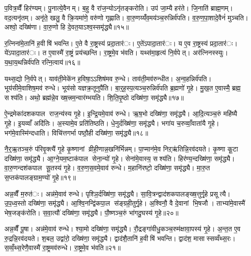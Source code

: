 प॒वित्र॒व्वैँ हिर॑ण्यम्। पु॒नात्ये॒वैनम्। ब॒हु वै रा॑ज॒न्योऽनृ॑तङ्करोति। उप॑ जा॒म्यै हर॑ते। जि॒नाति॑ ब्राह्म॒णम्। वद॒त्यनृ॑तम्। अनृ॑ते॒ खलु॒ वै क्रि॒यमा॑णे॒ वरु॑णो गृह्णाति। वा॒रु॒णय्यँ॑व॒मय॑ञ्च॒रुन्निर्व॑पति। व॒रु॒ण॒पा॒शादे॒वैनं॑ मुञ्चति। अश्वो॒ दख्षि॑णा। वा॒रु॒णो हि दे॒वत॒याऽश्व॒स्समृ॑द्ध्यै॥१५॥


र॒त्निना॑मे॒तानि॑ ह॒वीषि॑ भवन्ति। ए॒ते वै रा॒ष्ट्रस्य॑ प्रदा॒तार॑ः। ए॒ते॑ऽपादा॒तार॑ः। य ए॒व रा॒ष्ट्रस्य॑ प्रदा॒तार॑ः। ये॑ऽपादा॒तार॑ः। त ए॒वास्मै॑ रा॒ष्ट्रं प्रय॑च्छन्ति। रा॒ष्ट्रमे॒व भ॑वति। यथ्स॑मा॒हृत्य॑ नि॒र्वपेत्। अर॑त्निनस्स्युः। य॒था॒य॒थन्निर्व॑पति रत्नि॒त्वाय॑॥१६॥

यथ्स॒द्यो नि॒र्वपेत्। याव॑ती॒मेके॑न ह॒विषा॒ऽऽशिष॑मव रु॒न्धे। ताव॑ती॒मव॑रुन्धीत। अ॒न्व॒हन्निर्व॑पति। भूय॑सीमे॒वाशिष॒मव॑ रुन्धे। भूय॑सो यज्ञक्र॒तूनुपै॑ति। बा॒र्॒ह॒स्प॒त्यञ्च॒रुन्निर्व॑पति ब्र॒ह्मणो॑ गृ॒हे। मु॒ख॒त ए॒वास्मै॒ ब्रह्म॒ सश्य॑ति। अथो॒ ब्रह्म॑न्ने॒व ख्ष॒त्त्रम॒न्वार॑म्भयति। शि॒ति॒पृ॒ष्ठो दख्षि॑णा॒ समृ॑द्ध्यै॥१७॥

ऐ॒न्द्रमेका॑दशकपाल राज॒न्य॑स्य गृ॒हे। इ॒न्द्रि॒यमे॒वाव॑ रुन्धे। ऋ॒ष॒भो दख्षि॑णा॒ समृ॑द्ध्यै। आ॒दि॒त्यञ्च॒रुं महि॑ष्यै गृ॒हे। इ॒यव्वाँ अदि॑तिः। अ॒स्यामे॒व प्रति॑तिष्ठति। धे॒नुर्दख्षि॑णा॒ समृ॑द्ध्यै। भगा॑य च॒रुव्वाँ॒वाता॑यै गृ॒हे। भग॑मे॒वास्मि॑न्दधाति। विचि॑त्तगर्भा पष्ठौ॒ही दख्षि॑णा॒ समृ॑द्ध्यै॥१८॥

नै॒र्॒ऋ॒तञ्च॒रुं प॑रिवृ॒क्त्यै॑ गृ॒हे कृ॒ष्णानां व्रीही॒णान्न॒खनि॑र्भिन्नम्। पा॒प्मान॑मे॒व निऱ्ऋ॑तिन्नि॒रव॑दयते। कृ॒ष्णा कू॒टा दख्षि॑णा॒ समृ॑द्ध्यै। आ॒ग्ने॒यम॒ष्टाक॑पाल सेना॒न्यो॑ गृ॒हे। सेना॑मे॒वास्य॒ सश्य॑ति। हिर॑ण्य॒न्दख्षि॑णा॒ समृ॑द्ध्यै। वा॒रु॒णन्दश॑कपाल सू॒तस्य॑ गृ॒हे। व॒रु॒ण॒स॒वमे॒वाव॑ रुन्धे। म॒हानि॑रष्टो॒ दख्षि॑णा॒ समृ॑द्ध्यै। मा॒रु॒त स॒प्तक॑पालङ्ग्राम॒ण्यो॑ गृ॒हे॥१९॥

अन्न॒व्वैँ म॒रुत॑ः। अन्न॑मे॒वाव॑ रुन्धे। पृश्ञि॒र्दख्षि॑णा॒ समृ॑द्ध्यै। सा॒वि॒त्रन्द्वाद॑शकपालङ्ख्ष॒त्तुर्गृ॒हे प्रसूत्यै। उ॒प॒ध्व॒स्तो दख्षि॑णा॒ समृ॑द्ध्यै। आ॒श्वि॒नन्द्वि॑कपा॒ल स॑ङ्ग्रही॒तुर्गृ॒हे। अ॒श्विनौ॒ वै दे॒वानां भि॒षजौ। ताभ्या॑मे॒वास्मै॑ भेष॒जङ्क॑रोति। स॒वा॒त्यौ॑ दख्षि॑णा॒ समृ॑द्ध्यै। पौ॒ष्णञ्च॒रुं भा॑गदु॒घस्य॑ गृ॒हे॥२०॥

अन्न॒व्वैँ पू॒षा। अन्न॑मे॒वाव॑ रुन्धे। श्या॒मो दख्षि॑णा॒ समृ॑द्ध्यै। रौ॒द्रङ्गा॑वीधु॒कञ्च॒रुम॑क्षावा॒पस्य॑ गृ॒हे। अ॒न्त॒त ए॒व रु॒द्रन्नि॒रव॑दयते। श॒बल॒ उद्वा॑रो॒ दख्षि॑णा॒ समृ॑द्ध्यै। द्वाद॑शै॒तानि॑ ह॒वीषि॑ भवन्ति। द्वाद॑श॒ मासास्सव्वँथ्स॒रः। स॒व्वँ॒थ्स॒रेणै॒वास्मै॑ रा॒ष्ट्रमव॑रुन्धे। रा॒ष्ट्रमे॒व भ॑वति॥२१॥

